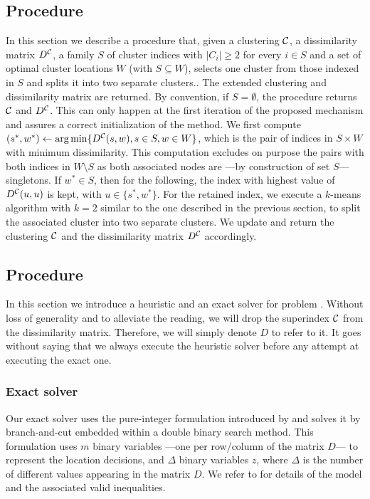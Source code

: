 \documentclass[ijoo,nonblindrev]{informs-ijoo}
\begin{document}
\subsection{Procedure \label{section:decrclust:splitadd}}

In this section we describe a procedure that, given a clustering $\mathcal{C}$, a dissimilarity matrix $D^{\mathcal{C}}$, a family $S$ of cluster indices with $|C_i|\geq 2$ for every $i\in S$ and a set of optimal cluster locations $W$ (with $S\subseteq W$), selects one cluster from those indexed in $S$ and splits it into two separate clusters.. The extended clustering and dissimilarity matrix are returned. By convention, if $S = \emptyset$, the procedure returns $\mathcal{C}$ and $D^{\mathcal{C}}$. This can only happen at the first iteration of the proposed mechanism and assures a correct initialization of the method. We first compute $(s^*, w^*)\leftarrow\arg\min\{D^{\mathcal{C}}(s, w), s\in S, w\in W\}$, which is the pair of indices in $S\times W$ with minimum dissimilarity. This computation excludes on purpose the pairs with both indices in $W\setminus S$ as both associated nodes are ---by construction of set $S$--- singletons. If $w^*\in S$, then for the following, the index with highest value of $D^{\mathcal{C}}(u, u)$ is kept, with $u \in \{s^*, w^*\}$. For the retained index, we execute a $k$-means algorithm with $k = 2$ similar to the one described in the previous section, to split the associated cluster into two separate clusters. We update and return the clustering $\mathcal{C}$ and the dissimilarity matrix $D^{\mathcal{C}}$ accordingly.

\subsection{Procedure \label{section:decrclust:solvepdp}}

In this section we introduce a heuristic and an exact solver for problem . Without loss of generality and to alleviate the reading, we will drop the superindex $\mathcal{C}$ from the dissimilarity matrix. Therefore, we will simply denote $D$ to refer to it. It goes without saying that we always execute the heuristic solver before any attempt at executing the exact one.

\subsubsection{Exact solver}

Our exact solver uses the pure-integer formulation introduced by \citet{Sayah2017new} and solves it by branch-and-cut embedded within a double binary search method. This formulation uses $m$ binary variables ---one per row/column of the matrix $D$--- to represent the location decisions, and $\Delta$ binary variables $z$, where $\Delta$ is the number of different values appearing in the matrix $D$. We refer to \citet{Sayah2017new} for details of the model and the associated valid inequalities.
\end{document}
